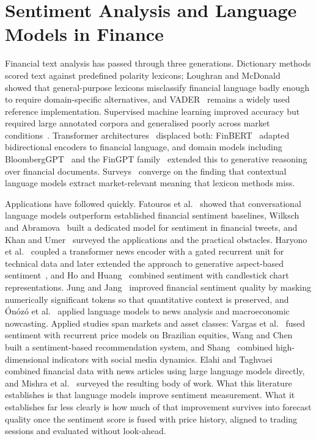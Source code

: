 \section{Sentiment Analysis and Language Models in Finance}

Financial text analysis has passed through three generations. Dictionary methods scored
text against predefined polarity lexicons; Loughran and McDonald~\cite{loughran2011}
showed that general-purpose lexicons misclassify financial language badly enough to
require domain-specific alternatives, and VADER~\cite{hutto2014} remains a widely used
reference implementation. Supervised machine learning improved accuracy but required large
annotated corpora and generalised poorly across market conditions~\cite{rouf2021}.
Transformer architectures~\cite{vaswani2017} displaced both: FinBERT~\cite{araci2019}
adapted bidirectional encoders to financial language, and domain models including
BloombergGPT~\cite{wu2023bloomberggpt} and the FinGPT
family~\cite{yang2023fingpt,wang2024fingptbench} extended this to generative reasoning
over financial documents. Surveys~\cite{li2024llmsurvey,todd2024,bahoo2024} converge on
the finding that contextual language models extract market-relevant meaning that lexicon
methods miss.

Applications have followed quickly. Fatouros et al.~\cite{fatouros2024} showed that
conversational language models outperform established financial sentiment baselines,
Wilksch and Abramova~\cite{wilksch2024} built a dedicated model for sentiment in financial
tweets, and Khan and Umer~\cite{khan2024chatgpt} surveyed the applications and the
practical obstacles. Haryono et al.~\cite{haryono2023} coupled a transformer news encoder
with a gated recurrent unit for technical data and later extended the approach to
generative aspect-based sentiment~\cite{haryono2024}, and Ho and Huang~\cite{ho2021}
combined sentiment with candlestick chart representations. Jung and
Jang~\cite{jung2024} improved financial sentiment quality by masking numerically
significant tokens so that quantitative context is preserved, and \'On\'oz\'o et
al.~\cite{onozo2024} applied language models to news analysis and macroeconomic
nowcasting. Applied studies span markets and asset classes: Vargas et
al.~\cite{vargas2022} fused sentiment with recurrent price models on Brazilian equities,
Wang and Chen~\cite{wang2024spcm} built a sentiment-based recommendation system, and
Shang~\cite{shang2025} combined high-dimensional indicators with social media dynamics.
Elahi and Taghvaei~\cite{elahi2024} combined financial data with news articles using
large language models directly, and Mishra et al.~\cite{mishra2025} surveyed the
resulting body of work. What this literature establishes is that language models improve
sentiment measurement. What it establishes far less clearly is how much of that
improvement survives into forecast quality once the sentiment score is fused with price
history, aligned to trading sessions and evaluated without look-ahead.

